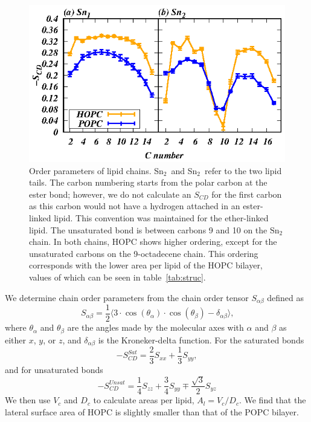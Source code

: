 \documentclass[12pt,openany,final]{book}
\begin{document}
\begin{figure}[p]
    \caption[Order parameters of lipid chains.]{ 
Order parameters of lipid chains. Sn$_2$~and Sn$_2$~refer to the two lipid tails. 
The carbon numbering starts from the polar carbon
at the ester bond; however, we do not calculate an $S_{CD}$ for the first carbon as this carbon would not have 
a hydrogen attached in an ester-linked lipid. 
This convention was maintained for the ether-linked lipid. The 
unsaturated bond is between carbons 9 and 10 on the $\text{Sn}_2$ chain.
In both chains, HOPC shows higher ordering, except for the unsaturated carbons on  the 
9-octadecene chain. This ordering corresponds with the lower area per lipid 
of the HOPC bilayer, values of which can be seen in table~\ref{tab:struc}. }
\label{fig:chainorder}
\includegraphics[width=\textwidth]{chainorder.eps}
\end{figure}
We determine chain order parameters from the chain order tensor $S_{\alpha\beta}$ defined as
\begin{equation}
\label{eq:chainorder}
S_{\alpha\beta}=\frac{1}{2}\bigg \langle 3 \cdot \cos(\theta_\alpha) \cdot \cos(\theta_\beta) - \delta_{\alpha\beta}\bigg \rangle\text{,}
\end{equation}
where $\theta_\alpha$ and $\theta_\beta$ are the angles made 
by the molecular axes with $\alpha$ and $\beta$ as either $x$, $y$, or $z$, and $\delta_{\alpha\beta}$ is 
the Kroneker-delta function. For the saturated bonds~\cite{egberts:1988}
\begin{equation}
\label{eq:chainorderparam}
-S^{Sat}_{CD}=\frac{2}{3}S_{xx}+\frac{1}{3}S_{yy},
\end{equation}
and for unsaturated bonds~\cite{douliez:1995}
\begin{equation}
-S^{Unsat}_{CD}=\frac{1}{4}S_{zz}+\frac{3}{4}S_{yy}\mp \frac{\sqrt{3}}{2}S_{yz}
\label{eq:chainordunsat}
\end{equation}
We then use $V_c$ and $D_c$ to calculate areas per lipid, $A_l = V_c / D_c$. We find that the 
lateral surface area of HOPC is slightly smaller than that of the POPC bilayer.
\end{document}
